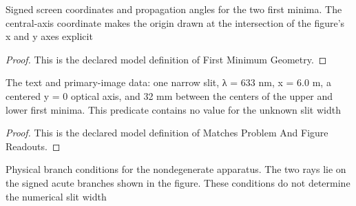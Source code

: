 \begin{definition}
  \label{def:physics:phyx-mini-0047:phyxminiproblems-problemphyxmini0047-firstminimumgeometry}
  Signed screen coordinates and propagation angles for the two first minima. The central-axis coordinate makes the origin drawn at the intersection of the figure's x and y axes explicit
\end{definition}
\begin{proof}
  This is the declared model definition of First Minimum Geometry.
\end{proof}
\begin{definition}
  \label{def:physics:phyx-mini-0047:phyxminiproblems-problemphyxmini0047-matchesproblemandfigurereadouts}
  The text and primary-image data: one narrow slit, λ = 633 nm, x = 6.0 m, a centered y = 0 optical axis, and 32 mm between the centers of the upper and lower first minima. This predicate contains no value for the unknown slit width
\end{definition}
\begin{proof}
  This is the declared model definition of Matches Problem And Figure Readouts.
\end{proof}
\begin{definition}
  \label{def:physics:phyx-mini-0047:phyxminiproblems-problemphyxmini0047-hasphysicalparameters}
  Physical branch conditions for the nondegenerate apparatus. The two rays lie on the signed acute branches shown in the figure. These conditions do not determine the numerical slit width
\end{definition}
